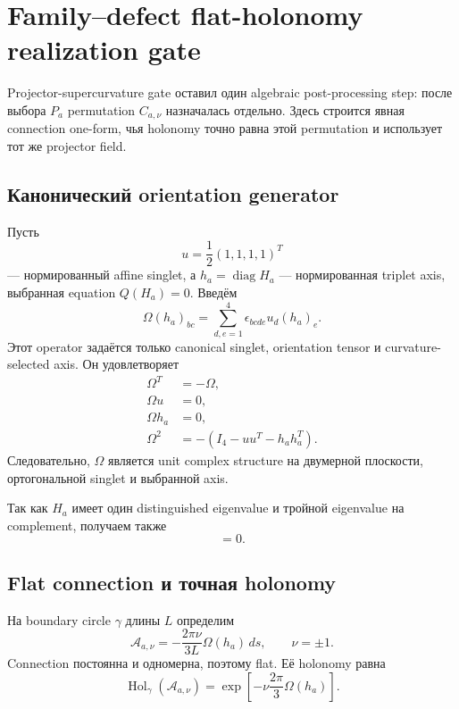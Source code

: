 \chapter{Family--defect flat-holonomy realization gate}

Projector-supercurvature gate оставил один algebraic post-processing step:
после выбора \(P_a\) permutation \(C_{a,\nu}\) назначалась отдельно. Здесь
строится явная connection one-form, чья holonomy точно равна этой
permutation и использует тот же projector field.

\section{Канонический orientation generator}

Пусть
\begin{equation}
 u=\frac12(1,1,1,1)^T
\end{equation}
--- нормированный affine singlet, а \(h_a=\operatorname{diag}H_a\) ---
нормированная triplet axis, выбранная equation \(Q(H_a)=0\). Введём
\begin{equation}
 \Omega(h_a)_{bc}
 =\sum_{d,e=1}^4\epsilon_{bcde}u_d(h_a)_e.
 \label{eq:orientation-generator}
\end{equation}
Этот operator задаётся только canonical singlet, orientation tensor и
curvature-selected axis. Он удовлетворяет
\begin{align}
 \Omega^T&=-\Omega,\\
 \Omega u&=0,\\
 \Omega h_a&=0,\\
 \Omega^2&=-\left(I_4-uu^T-h_ah_a^T\right).
\end{align}
Следовательно, \(\Omega\) является unit complex structure на двумерной
плоскости, ортогональной singlet и выбранной axis.

Так как \(H_a\) имеет один distinguished eigenvalue и тройной eigenvalue
на complement, получаем также
\begin{equation}
 [\Omega(h_a),H_a]=0.
 \label{eq:connection-field-commutator}
\end{equation}

\section{Flat connection и точная holonomy}

На boundary circle \(\gamma\) длины \(L\) определим
\begin{equation}
 \mathcal A_{a,\nu}
 =-\frac{2\pi\nu}{3L}\Omega(h_a)\,ds,
 \qquad \nu=\pm1.
 \label{eq:projector-flat-connection}
\end{equation}
Connection постоянна и одномерна, поэтому flat. Её holonomy равна
\begin{equation}
 \operatorname{Hol}_\gamma(\mathcal A_{a,\nu})
 =\exp\!\left[-\nu\frac{2\pi}{3}\Omega(h_a)\right].
\end{equation}

